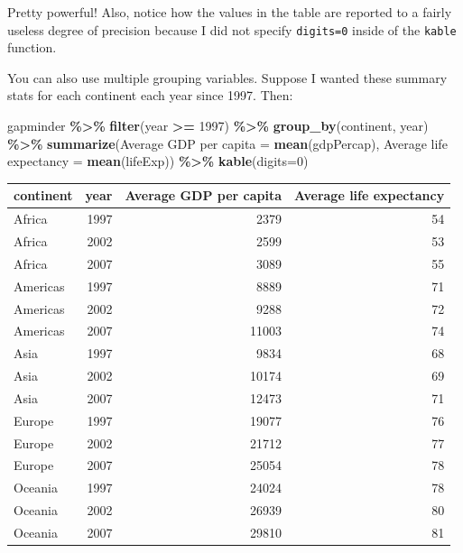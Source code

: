 \documentclass[
]{book}
\makeatletter
\newenvironment{Shaded}{\begin{snugshade}}{\end{snugshade}}
\newcommand{\AttributeTok}[1]{\textcolor[rgb]{0.27,0.27,0.27}{#1}}
\newcommand{\DecValTok}[1]{\textcolor[rgb]{0.06,0.06,0.06}{#1}}
\newcommand{\FunctionTok}[1]{\textcolor[rgb]{0.27,0.27,0.27}{\textbf{#1}}}
\newcommand{\NormalTok}[1]{#1}
\newcommand{\OtherTok}[1]{\textcolor[rgb]{0.37,0.37,0.37}{#1}}
\newcommand{\SpecialCharTok}[1]{\textcolor[rgb]{0.43,0.43,0.43}{\textbf{#1}}}
\newcommand{\StringTok}[1]{\textcolor[rgb]{0.5,0.5,0.5}{#1}}
\newenvironment{kframe}{%
\medskip{}
\setlength{\fboxsep}{.8em}
 \def\at@end@of@kframe{}%
 \ifinner\ifhmode%
  \def\at@end@of@kframe{\end{minipage}}%
  \begin{minipage}{\columnwidth}%
 \fi\fi%
 \def\FrameCommand##1{\hskip\@totalleftmargin \hskip-\fboxsep
 \colorbox{shadecolor}{##1}\hskip-\fboxsep
     \hskip-\linewidth \hskip-\@totalleftmargin \hskip\columnwidth}%
 \MakeFramed {\advance\hsize-\width
   \@totalleftmargin\z@ \linewidth\hsize
   \@setminipage}}%
 {\par\unskip\endMakeFramed%
 \at@end@of@kframe}
\renewenvironment{Shaded}{\begin{kframe}}{\end{kframe}}
\makeatother
\begin{document}
Pretty powerful! Also, notice how the values in the table are reported to a fairly useless degree of precision because I did not specify \texttt{digits=0} inside of the \texttt{kable} function.

You can also use multiple grouping variables. Suppose I wanted these summary stats for each continent each year since 1997. Then:

\begin{Shaded}
\begin{Highlighting}[]
\NormalTok{gapminder }\SpecialCharTok{\%\textgreater{}\%} 
  \FunctionTok{filter}\NormalTok{(year }\SpecialCharTok{\textgreater{}=} \DecValTok{1997}\NormalTok{) }\SpecialCharTok{\%\textgreater{}\%} 
  \FunctionTok{group\_by}\NormalTok{(continent, year) }\SpecialCharTok{\%\textgreater{}\%} 
  \FunctionTok{summarize}\NormalTok{(}\StringTok{\textquotesingle{}Average GDP per capita\textquotesingle{}} \OtherTok{=} \FunctionTok{mean}\NormalTok{(gdpPercap), }
            \StringTok{\textquotesingle{}Average life expectancy\textquotesingle{}} \OtherTok{=} \FunctionTok{mean}\NormalTok{(lifeExp)) }\SpecialCharTok{\%\textgreater{}\%} 
  \FunctionTok{kable}\NormalTok{(}\AttributeTok{digits=}\DecValTok{0}\NormalTok{)}
\end{Highlighting}
\end{Shaded}

\begin{tabular}{l|r|r|r}
\hline
continent & year & Average GDP per capita & Average life expectancy\\
\hline
Africa & 1997 & 2379 & 54\\
\hline
Africa & 2002 & 2599 & 53\\
\hline
Africa & 2007 & 3089 & 55\\
\hline
Americas & 1997 & 8889 & 71\\
\hline
Americas & 2002 & 9288 & 72\\
\hline
Americas & 2007 & 11003 & 74\\
\hline
Asia & 1997 & 9834 & 68\\
\hline
Asia & 2002 & 10174 & 69\\
\hline
Asia & 2007 & 12473 & 71\\
\hline
Europe & 1997 & 19077 & 76\\
\hline
Europe & 2002 & 21712 & 77\\
\hline
Europe & 2007 & 25054 & 78\\
\hline
Oceania & 1997 & 24024 & 78\\
\hline
Oceania & 2002 & 26939 & 80\\
\hline
Oceania & 2007 & 29810 & 81\\
\hline
\end{tabular}
\end{document}
